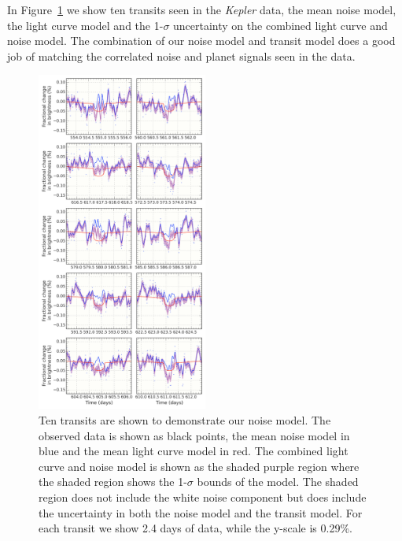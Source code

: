\documentclass[apjl]{emulateapj}
\begin{document}
In Figure~\ref{fig:filter} we show ten transits seen in the \emph{Kepler} data, the mean noise model, the light curve model and the 1-$\sigma$ uncertainty on the combined light curve and noise model. The combination of our noise model and transit model does a good job of matching the correlated noise and planet signals seen in the data.

\begin{figure}
\includegraphics[width=0.50\textwidth]{several_transits_shaded.pdf}
\caption{Ten transits are shown to demonstrate our noise model. The observed data is shown as black points, the mean noise model in blue and the mean light curve model in red. The combined light curve and noise model is shown as the shaded purple region where the shaded region shows the 1-$\sigma$  bounds of the model. The shaded region does not include the white noise component but does include the uncertainty in both the noise model and the transit model. For each transit we show 2.4 days of data, while the y-scale is 0.29\%.}
\label{fig:filter}
\end{figure}
\end{document}
